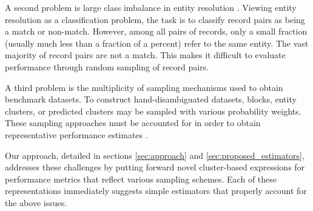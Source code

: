 \documentclass[fontsize=11pt]{article}
\theoremstyle{definition}
\begin{document}
A second problem is large class imbalance in entity resolution \citep{Marchant2017}. {Viewing entity resolution as a classification problem, the task is to classify record pairs as being a match or non-match. However,} among all pairs of records, only a small fraction (usually much less than a fraction of a percent) refer to the same entity. The vast majority of record pairs are not a match. This makes it difficult to evaluate performance through random sampling of record pairs.

A third problem is the multiplicity of sampling mechanisms used to obtain benchmark datasets. To construct hand-disambiguated datasets, blocks, entity clusters, or predicted clusters may be sampled with various probability weights. These sampling approaches must be accounted for in order to obtain representative performance estimates \citep{fuller2011sampling}.

Our approach, detailed in sections \ref{sec:approach} and \ref{sec:proposed_estimators}, addresses these challenges by putting forward novel cluster-based expressions for performance metrics that reflect various sampling schemes. Each of these representations immediately suggests simple estimators that properly account for the above issues.
\end{document}
